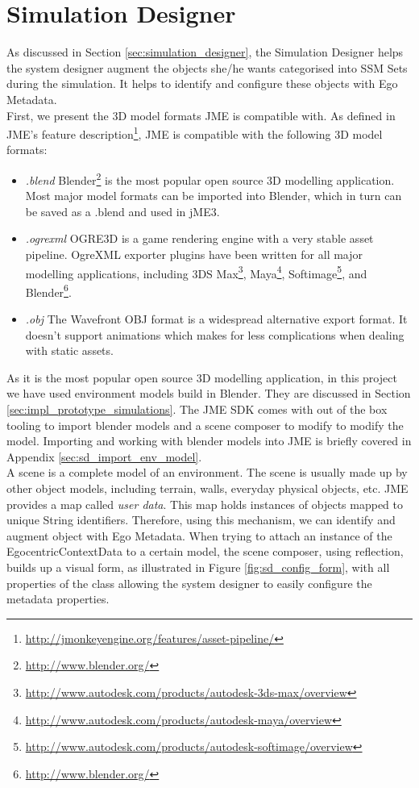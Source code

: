 \section{Simulation Designer} %
\label{sec:impl_simulation_designer}
As discussed in Section \ref{sec:simulation_designer}, the Simulation Designer helps the system designer augment the objects she/he wants categorised into SSM Sets during the simulation. It helps to identify and configure these objects with Ego Metadata.\\

First, we present the 3D model formats JME is compatible with. As defined in JME's feature description\footnote{\url{http://jmonkeyengine.org/features/asset-pipeline/}}, JME is compatible with the following 3D model formats:
\begin{itemize}
	\item \emph{.blend} Blender\footnote{\url{http://www.blender.org/}} is the most popular open source 3D modelling application. Most major model formats can be imported into Blender, which in turn can be saved as a .blend and used in jME3.
	\item \emph{.ogrexml} OGRE3D is a game rendering engine with a very stable asset pipeline. OgreXML exporter plugins have been written for all major modelling  applications, including 3DS Max\footnote{\url{http://www.autodesk.com/products/autodesk-3ds-max/overview}}, Maya\footnote{\url{http://www.autodesk.com/products/autodesk-maya/overview}}, Softimage\footnote{\url{http://www.autodesk.com/products/autodesk-softimage/overview}}, and Blender\footnote{\url{http://www.blender.org/}}.
	\item \emph{.obj} The Wavefront OBJ format is a widespread alternative export format. It doesn't support animations which makes for less complications when dealing with static assets.
\end{itemize}

As it is the most popular open source 3D modelling application, in this project we have used environment models build in Blender. They are discussed in Section \ref{sec:impl_prototype_simulations}. The JME SDK comes with out of the box tooling to import blender models and a scene composer to modify to modify the model. Importing and working with blender models into JME is briefly covered in Appendix \ref{sec:sd_import_env_model}.\\

A scene is a complete model of an environment. The scene is usually made up by other object models, including terrain, walls, everyday physical objects, etc. JME provides a map called \emph{user data}. This map holds instances of objects mapped to unique String identifiers. Therefore, using this mechanism, we can identify and augment object with Ego Metadata. When trying to attach an instance of the EgocentricContextData to a certain model, the scene composer, using reflection, builds up a visual form, as illustrated in Figure \ref{fig:sd_config_form}, with all properties of the class allowing the system designer to easily configure the metadata properties.\\

